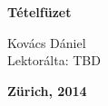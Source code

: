 
\thispagestyle{empty}
\renewcommand{\baselinestretch}{1.3}\normalsize

\vspace*{6.5cm}

\begin{center}
  \par {\LARGE\bfseries T\'{e}telf\"{u}zet}
\end{center}

\vspace*{1em}

\begin{center}
Kov\'{a}cs D\'{a}niel\\
Lektor\'{a}lta: TBD
\end{center}


\begin{center}
  {\Large\bfseries Z\"{u}rich, 2014}
	
  {\Large\cc\bysa}
\end{center}
\cleardoublepage
